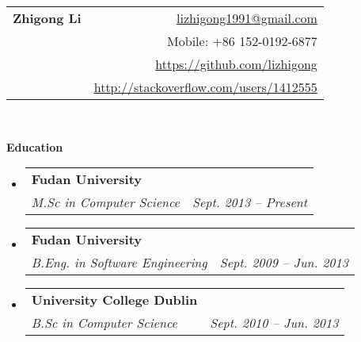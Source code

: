 \documentclass[letterpaper,10pt]{article}
\makeatletter
\newcommand{\resitem}[1]{\item #1 \vspace{-2pt}}
\newcommand{\resheading}[1]{{\large \colorbox{mygrey}{\begin{minipage}{\textwidth}{\textbf{#1 \vphantom{p\^{E}}}}\end{minipage}}}}
\newcommand{\ressubheading}[4]{
\begin{tabular*}{6.5in}{l@{\extracolsep{\fill}}r}
		\textbf{#1} & #2 \\
		#3 & #4 \\
\end{tabular*}\vspace{-6pt}}
\makeatother
\begin{document}
\newcommand{\mywebheader}{
\begin{tabular*}{7in}{l@{\extracolsep{\fill}}r}
	\textbf{{\Huge Zhigong Li}} & \href{mailto:lizhigong1991@gmail.com}{lizhigong1991@gmail.com}\\
     & {Mobile: +86 152-0192-6877}\\
     & \href{https://github.com/lizhigong}{https://github.com/lizhigong} \\
     & \href{http://stackoverflow.com/users/1412555}{http://stackoverflow.com/users/1412555} \\
	\end{tabular*}
\\
\vspace{0.1in}}

\mywebheader


\resheading{Education}
	\begin{itemize}
       \item
			\ressubheading{Fudan University}{}{\emph{M.Sc in Computer Science}}{\emph{Sept. 2013 -- Present}}
			{
                    
			}


    \item
			\ressubheading{Fudan University}{}{\emph{B.Eng. in Software Engineering}}{\emph{Sept. 2009 -- Jun. 2013}}
			{
			}
	\item 
			\ressubheading{University College Dublin}{}{\emph{B.Sc in Computer Science}}{\emph{Sept. 2010 -- Jun. 2013}}
	\end{itemize} %
\end{document}

